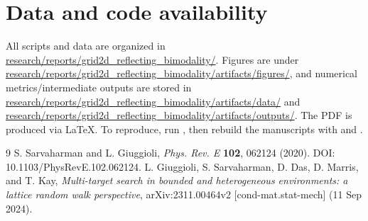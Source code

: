 \documentclass[11pt]{article}
\begin{document}
\section{Data and code availability}
All scripts and data are organized in \url{research/reports/grid2d_reflecting_bimodality/}. Figures are under \url{research/reports/grid2d_reflecting_bimodality/artifacts/figures/}, and numerical metrics/intermediate outputs are stored in \url{research/reports/grid2d_reflecting_bimodality/artifacts/data/} and \url{research/reports/grid2d_reflecting_bimodality/artifacts/outputs/}. The PDF is produced via \LaTeX{}. To reproduce, run , then rebuild the manuscripts with  and .

\begin{thebibliography}{9}
   S. Sarvaharman and L. Giuggioli, \emph{Phys. Rev. E} \textbf{102}, 062124 (2020). DOI: 10.1103/PhysRevE.102.062124.
   L. Giuggioli, S. Sarvaharman, D. Das, D. Marris, and T. Kay, \emph{Multi-target search in bounded and heterogeneous environments: a lattice random walk perspective}, arXiv:2311.00464v2 [cond-mat.stat-mech] (11 Sep 2024).
\end{thebibliography}
\end{document}
